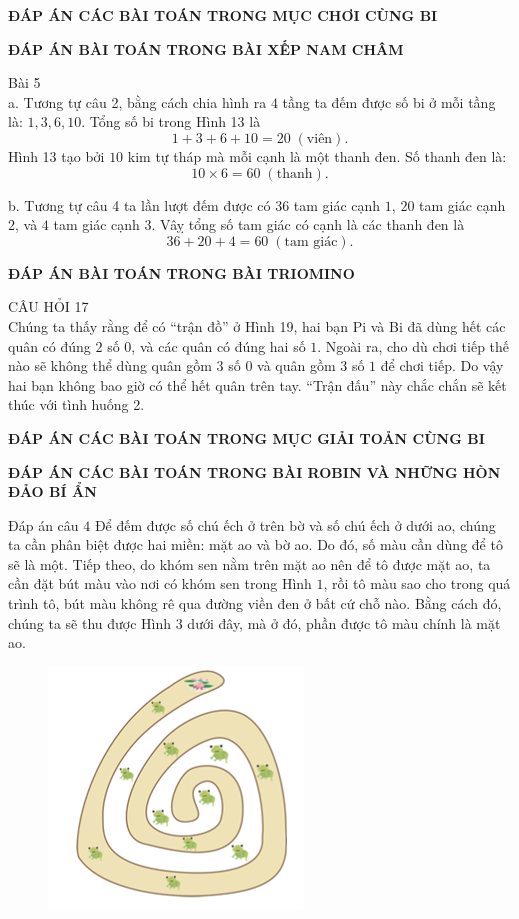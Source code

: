 \graphicspath{{../loigiai/pic/}}

\begin{center}
	\textbf{ĐÁP ÁN CÁC BÀI TOÁN TRONG MỤC CHƠI CÙNG BI}
\end{center}
\begin{center}
	\textbf{ĐÁP ÁN BÀI TOÁN TRONG BÀI XẾP NAM CHÂM}
\end{center}
Bài 5\\
a.	Tương tự câu 2, bằng cách chia hình ra $4$ tầng ta đếm được số bi ở mỗi tầng là: $1,3,6,10$. Tổng số bi trong Hình 13 là
$$1+3+6+10= 20 \;(\text{viên}).$$
Hình 13 tạo bởi $10$ kim tự tháp mà mỗi cạnh là một thanh đen. Số thanh đen là: 
$$10\times 6=60 \;(\text{thanh}).$$


b.	Tương tự câu 4 ta lần lượt đếm được có $36$ tam  giác cạnh $1$, $20$ tam giác cạnh $2$, và $4$ tam giác cạnh $3$. Vâỵ tổng số tam giác có cạnh là các thanh đen là 
$$36+20+4=60  \;(\text{tam giác}).$$
\begin{center}
	\textbf{ĐÁP ÁN BÀI TOÁN TRONG BÀI TRIOMINO}
\end{center}
CÂU HỎI 17\\
Chúng ta thấy rằng để có “trận đồ” ở Hình 19, hai bạn Pi và Bi đã dùng hết các quân có đúng $2$ số $0$, và các quân có đúng hai số $1$. Ngoài ra, cho dù chơi tiếp thế nào sẽ không thể dùng quân gồm $3$ số $0$ và quân gồm $3$ số $1$ để chơi tiếp. Do vậy hai bạn không bao giờ có thể hết quân trên tay. “Trận đấu” này chắc chắn sẽ kết thúc với tình huống 2.
\newpage
\newpage
\begin{center}
	\textbf{ĐÁP ÁN CÁC BÀI TOÁN TRONG MỤC GIẢI TOẢN CÙNG BI}
\end{center}
\begin{center}
	\textbf{ĐÁP ÁN CÁC BÀI TOÁN TRONG BÀI ROBIN VÀ NHỮNG HÒN ĐẢO BÍ ẨN}
\end{center}
Đáp án câu $4$
\vskip 0.1cm
Để đếm được số chú ếch ở trên bờ và số chú ếch ở dưới ao, chúng ta cần phân biệt được hai miền: mặt ao và bờ ao. Do đó, số màu cần dùng để tô sẽ là một. Tiếp theo, do khóm sen nằm trên mặt ao nên để tô được mặt ao, ta cần đặt bút màu vào nơi có khóm sen trong Hình $1$, rồi tô màu sao cho trong quá trình tô, bút màu không rê qua đường viền đen ở bất cứ chỗ nào. Bằng cách đó, chúng ta sẽ thu được Hình $3$ dưới đây, mà ở đó, phần được tô màu chính là mặt ao. 
\begin{figure}[H]
	\centering
	\vspace*{-5pt}
	\captionsetup{labelformat= empty, justification=centering}
	\includegraphics[width=0.4\linewidth]{1}
	\vspace*{-15pt}
\end{figure}
